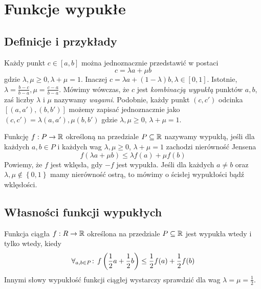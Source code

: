 \documentclass[9pt]{article}
\begin{document}
\section{Funkcje wypukłe}

\subsection{Definicje i przykłady}

Każdy punkt $c \in [a,b]$ można jednoznacznie przedstawić w postaci
\[
    c = \lambda a + \mu b
\]
gdzie $\lambda, \mu \ge 0, \lambda + \mu = 1$. Inaczej
$c = \lambda a + (1-\lambda)b, \lambda \in [0, 1]$.
Istotnie, $\lambda = \frac{b-c}{b-a}, \mu = \frac{c-a}{b-a}$.
Mówimy wówczas, że $c$ jest \emph{kombinacją wypukłą} punktów $a, b$, zaś liczby $\lambda$ i $\mu$
nazywamy \emph{wagami}. Podobnie, każdy punkt $(c, c')$ odcinka $[(a,a'), (b, b')]$ możemy zapisać
jednoznacznie jako $(c, c') = \lambda (a,a'), \mu (b, b')$ gdzie $\lambda, \mu \ge 0$,
$\lambda + \mu = 1$.

\begin{Def}
    Funkcję $f: P \to \mathbb{R}$ określoną na przedziale $P \subseteq \mathbb{R}$ nazywamy wypukłą, jeśli dla
    każdych $a, b \in P$ i każdych wag $\lambda, \mu \ge 0$, $\lambda + \mu = 1$ zachodzi nierówność
    Jensena
    \[
        f (\lambda a + \mu b) \le \lambda f(a) + \mu f(b)
    \]
    Powiemy, że $f$ jest wklęsła, gdy $-f$ jest wypukła.
    Jeśli dla każdych $a \ne b$ oraz $\lambda, \mu \notin \left\{0, 1\right\}$ mamy nierówność
    ostrą, to mówimy o ścisłej wypukłości bądź wklęsłości.
\end{Def}

\subsection{Własności funkcji wypukłych}

\begin{Twi}
    Funkcja ciągła $f: R \to \mathbb{R}$ określona na przedziale $P \subseteq \mathbb{R}$ jest wypukła wtedy i tylko
    wtedy, kiedy
    \[
        \forall_{a, b \in P} \! : \, f \left(\frac{1}{2}a + \frac{1}{2}b\right) \le \frac{1}{2}f(a) + \frac{1}{2}f(b)
    \]
    Innymi słowy wypukłość funkcji ciągłej wystarczy sprawdzić dla wag
    $\lambda = \mu = \frac{1}{2}$.
\end{Twi}
\end{document}
